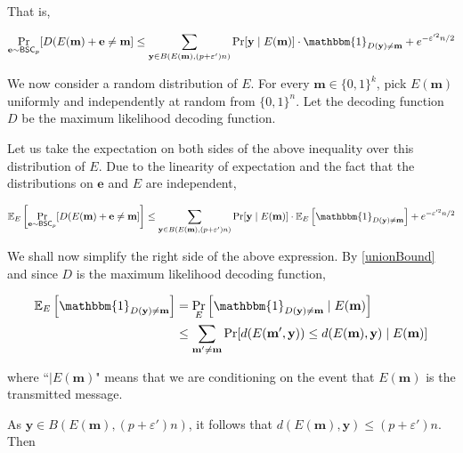 That is,

$$\Pr_{\textbf{e}\sim\BSC_p}[D(E(\textbf{m})+\textbf{e}\neq \textbf{m}] \leq \sum_{\textbf{y}\in B(E(\textbf{m}), (p+\varepsilon')n)}\Pr[\textbf{y}\mid E(\textbf{m})]\cdot \mathbbm{1}_{D(\textbf{y})\neq \textbf{m}} + e^{-\varepsilon'^2n/2}$$

We now consider a random distribution of $E$. For every $\textbf{m}\in\{0,1\}^k$, pick $E(\textbf{m})$ uniformly and independently at random from $\{0,1\}^n$. Let the decoding function $D$ be the maximum likelihood decoding function.

\vspace{2mm}
Let us take the expectation on both sides of the above inequality over this distribution of $E$. Due to the linearity of expectation and the fact that the distributions on $\textbf{e}$ and $E$ are independent,

$$\expec_E\left[\Pr_{\textbf{e}\sim\BSC_p}[D(E(\textbf{m})+\textbf{e}\neq \textbf{m}]\right] \leq \sum_{\textbf{y}\in B(E(\textbf{m}), (p+\varepsilon')n)}\Pr[\textbf{y}\mid E(\textbf{m})]\cdot \expec_E\left[\mathbbm{1}_{D(\textbf{y})\neq \textbf{m}}\right] + e^{-\varepsilon'^2n/2}$$

We shall now simplify the right side of the above expression. By \ref{unionBound} and since $D$ is the maximum likelihood decoding function,

\begin{align*}
    \expec_E\left[\mathbbm{1}_{D(\textbf{y})\neq \textbf{m}}\right] &= \Pr_E\left[\mathbbm{1}_{D(\textbf{y})\neq \textbf{m}}   \mid E(\textbf{m}) \right] \\
    &\leq \sum_{\textbf{m}'\neq \textbf{m}} \Pr[d(E(\textbf{m}', \textbf{y}))\leq d(E(\textbf{m}),\textbf{y})\mid E(\textbf{m})]
\end{align*}

where ``$\mid E(\textbf{m})$" means that we are conditioning on the event that $E(\textbf{m})$ is the transmitted message.

As $\textbf{y}\in B(E(\textbf{m}), (p+\varepsilon')n)$, it follows that $d(E(\textbf{m}), \textbf{y})\leq (p+\varepsilon')n$. Then

